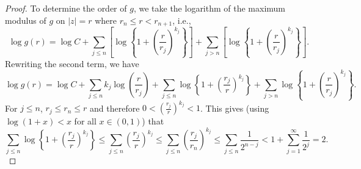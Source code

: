 \documentclass[11pt,a4paper]{article}
\begin{document}
\begin{proof}
	\par To determine the order of $g$, we take the logarithm of the maximum modulus of $g$ on $|z|=r$  where $r_n\leq r<r_{n+1}$, i.e.,  $$\log g(r)=\log C+\sum_{j\leq n}\left[\log\left\{ 1+ \left(\frac{r}{r_j}\right)^{k_j}\right\}\right]+\sum_{j> n}\left[\log\left\{ 1+ \left(\frac{r}{r_j}\right)^{k_j}\right\}\right].$$
Rewriting the second term, we have
	\begin{equation}\label{Eq12}
		\log g(r)=\log C+\sum_{j\leq n}k_j\log\left(\frac{r}{r_j}\right)+\sum_{j\leq n}\log\left\{ 1+ \left(\frac{r_j}{r}\right)^{k_j}\right\}+\sum_{j>n}\log\left\{ 1+ \left(\frac{r}{r_j}\right)^{k_j}\right\}.
	\end{equation} 
	For $j\leq n$, $r_j \leq r_n  \leq r$ and therefore $0<\left(\frac{r_j}{r}\right)^{k_j}<1$. This gives (using $\log (1+x) <x$ for all $x \in (0,1)$) that $$\sum_{j\leq n}\log\left\{ 1+ \left(\frac{r_j}{r}\right)^{k_j}\right\}\leq \sum_{j\leq n}\left(\frac{r_j}{r}\right)^{k_j}\leq \sum_{j \leq n } \left(\frac{r_j}{r_n}\right)^{k_j} \leq \sum_{j \leq n } \frac{1}{2^{n-j}} < 1+ \sum_{j =1}^{\infty} \frac{1}{2^{ j}}=2.$$ 
	

\end{proof}
\end{document}
